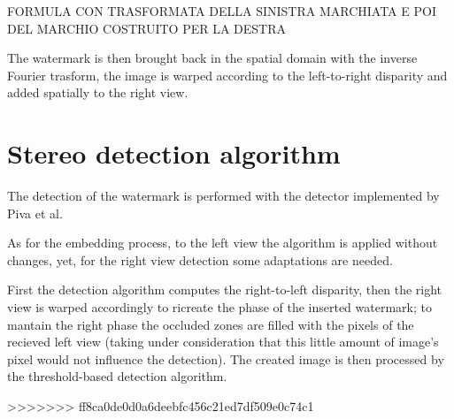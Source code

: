 FORMULA CON TRASFORMATA DELLA SINISTRA MARCHIATA E POI DEL MARCHIO COSTRUITO PER LA DESTRA

The watermark is then brought back in the spatial domain with the inverse Fourier trasform, the image is warped according to the left-to-right disparity and added spatially to the right view.

\section{Stereo detection algorithm}

The detection of the watermark is performed with the detector implemented by Piva et al.

As for the embedding process, to the left view the algorithm is applied without changes, yet, for the right view detection some adaptations are needed.

First the detection algorithm computes the right-to-left disparity, then the right view is warped accordingly to ricreate the phase of the inserted watermark; to mantain the right phase the occluded zones are filled with the pixels of the recieved left view (taking under consideration that this little amount of image's pixel would not influence the detection).
The created image is then processed by the threshold-based detection algorithm. 




>>>>>>> ff8ca0de0d0a6deebfc456c21ed7df509e0c74c1
